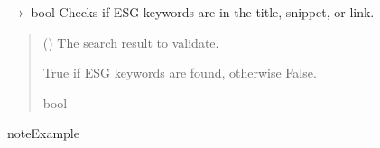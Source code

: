 \documentclass[letterpaper,10pt,english]{sphinxmanual}
\begin{document}
\begin{fulllineitems}
\begin{fulllineitems}
\end{fulllineitems}


\begin{fulllineitems}
\label{\detokenize{src.esg_reports:src.esg_reports.validate.SearchResultValidator._keywords_in_result}}
\pysigstartsignatures
\pysiglinewithargsret
{}
{}
{{ $\rightarrow$ bool}}
\pysigstopsignatures
\sphinxAtStartPar
Checks if ESG keywords are in the title, snippet, or link.
\begin{quote}\begin{description}
\sphinxAtStartPar
{} ({\hyperref[\detokenize{src.data_models:src.data_models.company.SearchResult}]{}}) \textendash{} The search result to validate.

\sphinxAtStartPar
True if ESG keywords are found, otherwise False.

\sphinxAtStartPar
bool

\end{description}\end{quote}

\begin{sphinxadmonition}{note}{Example}


\end{sphinxadmonition}
\end{fulllineitems}
\end{fulllineitems}
\end{document}
